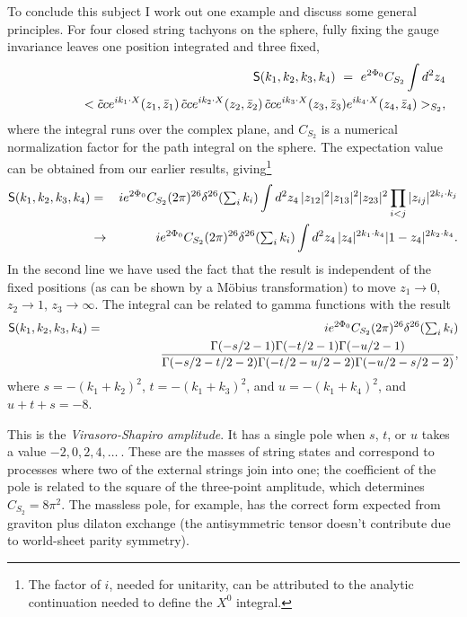 
To conclude this subject I work out one example and discuss some
general principles.  For four closed string tachyons on the sphere,
fully fixing the gauge invariance leaves one position integrated and
three fixed,
\begin{eqnarray}
&&{\sf S}(k_1,k_2,k_3,k_4) 
\ =\  e^{2\Phi_0} C_{S_2}
\int d^2 z_4  \label{4p} \\
&&\qquad\qquad < \tilde{c} c e^{ik_1 \cdot X} (z_1,\bar z_1)\,
\tilde{c} c e^{ik_2 \cdot X} (z_2,\bar z_2)\, \tilde{c} c e^{ik_3
\cdot X} (z_3, \bar z_3) e^{ik_4 \cdot X} (z_4,\bar z_4)>_{S_2},
\nonumber
\end{eqnarray}
where the integral runs over the complex plane,
and $C_{S_2}$ is a numerical normalization factor for the path
integral on the sphere.  The expectation value can be obtained from
our earlier results, giving\footnote
{The factor of $i$, needed for unitarity, can be attributed to the
analytic continuation needed to define the $X^0$ integral.}
\begin{eqnarray}
{\sf S}(k_1,k_2,k_3,k_4) 
&=& ie^{2\Phi_0} C_{S_2} (2\pi)^{26} \delta^{26}({\textstyle \sum_i
k_i}) \int d^2 z_4\,
|z_{12}|^2 |z_{13}|^2 |z_{23}|^2 \prod_{i < j} 
|z_{ij}|^{2 k_i \cdot k_j} \nonumber\\
&\to& ie^{2\Phi_0} C_{S_2} (2\pi)^{26}\delta^{26}({\textstyle \sum_i
k_i}) \int d^2 z_4\, |z_4|^{2 k_1 \cdot k_4} |1-z_4|^{2 k_2 \cdot
k_4}. \label{vsint}
\end{eqnarray}
In the second line we have used the fact that the result is
independent of the fixed positions (as can be shown by a M\"obius
transformation) to move $z_1 \to 0$, $z_2 \to 1$, $z_3 \to \infty$.
The integral can be related to gamma functions with the result
\begin{eqnarray}
{\sf S}(k_1,k_2,k_3,k_4) 
&=& ie^{2\Phi_0} C_{S_2} (2\pi)^{26} \delta^{26}({\textstyle \sum_i
k_i}) \\
&&\qquad\qquad \frac
{\Gamma(- s/2 - 1) \Gamma(- t/2 - 1) \Gamma(- u/2 -1)}
{\Gamma(- s/2 - t/2 - 2) \Gamma(- t/2 - u/2 -2)
\Gamma(- u/2 - s/2 -2)},  
\nonumber
\end{eqnarray}
where $s = - (k_1 + k_2)^2$, $t = - (k_1 + k_3)^2$, and $u = - (k_1 +
k_4)^2$, and $u + t + s = -8$.

This is the {\it Virasoro-Shapiro amplitude}.  It has a single pole
when $s$, $t$, or $u$ takes a value $-2, 0, 2, 4, \ldots\ $.  These
are the masses of string states and correspond to processes where
two of the external strings join into one; the coefficient of the
pole is related to the square of the three-point amplitude, which
determines $C_{S_2} = 8\pi^2$.  The massless pole, for example, has
the correct form expected from graviton plus dilaton exchange (the
antisymmetric tensor doesn't contribute due to world-sheet parity
symmetry).

